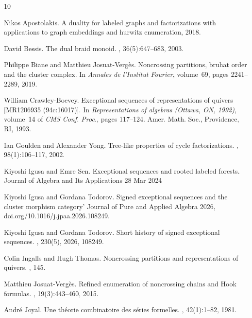 \documentclass[11pt]{amsart}
\begin{document}
%

\begin{thebibliography}{10}


Nikos Apostolakis.
\newblock A duality for labeled graphs and factorizations with applications to
  graph embeddings and hurwitz enumeration, 2018.

David Bessis.
\newblock The dual braid monoid.
,
  36(5):647--683, 2003.

Philippe Biane and Matthieu Josuat-Verg{\`e}s.
\newblock Noncrossing partitions, bruhat order and the cluster complex.
\newblock In {\em Annales de l'Institut Fourier}, volume~69, pages 2241--2289,
  2019.

William Crawley-Boevey.
\newblock Exceptional sequences of representations of quivers [{MR}1206935
  (94c:16017)].
\newblock In {\em Representations of algebras ({O}ttawa, {ON}, 1992)},
  volume~14 of {\em CMS Conf. Proc.}, pages 117--124. Amer. Math. Soc.,
  Providence, RI, 1993.

Ian Goulden and Alexander Yong.
\newblock Tree-like properties of cycle factorizations.
, 98(1):106--117, 2002.

Kiyoshi Igusa and Emre Sen.
\newblock Exceptional sequences and rooted labeled forests.
\newblock Journal of Algebra and Its Applications 28 Mar 2024

Kiyoshi Igusa and Gordana Todorov.
\newblock Signed exceptional sequences and the cluster morphism category'
\newblock Journal of Pure and Applied Algebra 2026, doi.org/10.1016/j.jpaa.2026.108249.

Kiyoshi Igusa and Gordana Todorov.
\newblock Short history of signed exceptional sequences.
, 230(5), 2026, 108249.

Colin Ingalls and Hugh Thomas.
\newblock Noncrossing partitions and representations of quivers.
, 145.

Matthieu Josuat-Verg\`es.
\newblock Refined enumeration of noncrossing chains and {H}ook formulas.
, 19(3):443--460, 2015.

Andr\'e Joyal.
\newblock Une th\'eorie combinatoire des s\'eries formelles.
, 42(1):1--82, 1981.


\end{thebibliography}
\end{document}
